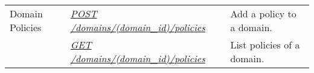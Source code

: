 \documentclass[letterpaper,10pt,english]{sphinxmanual}
\begin{document}
\noindent\begin{tabulary}{\linewidth}{|L|L|L|}
\hline
{}\relax &\relax &\relax \\
\hline
Domain Policies
&
{\hyperref[\detokenize{resources/domain:post--domains-(domain_id)-policies}]{\emph{POST /domains/(domain\_id)/policies}}}
&
Add a policy to a domain.
\\
\hline&
{\hyperref[\detokenize{resources/domain:get--domains-(domain_id)-policies}]{\emph{GET /domains/(domain\_id)/policies}}}
&
List policies of a domain.
\\
\hline\end{tabulary}


\begin{DUlineblock}{0em}
\item[] 
\end{DUlineblock}
\end{document}
